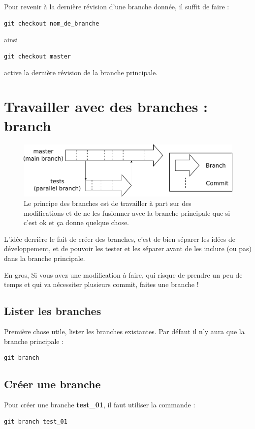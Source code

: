 \documentclass[a4paper,twoside]{article}
\begin{document}
Pour revenir à la dernière révision d'une branche donnée, il suffit de faire :
\begin{verbatim}
git checkout nom_de_branche
\end{verbatim}
ainsi
\begin{verbatim}
git checkout master
\end{verbatim}
active la dernière révision de la branche principale.


\section{Travailler avec des branches : branch}
\begin{figure}[htb]
\centering
\includegraphics[width=0.75\linewidth]{figure/branchs.pdf}
\caption{Le principe des branches est de travailler à part sur des modifications et de ne les fusionner avec la branche principale que si c'est ok et ça donne quelque chose.}
\end{figure}

L'idée derrière le fait de créer des branches, c'est de bien séparer les idées de développement, et de pouvoir les tester et les séparer avant de les inclure (ou pas) dans la branche principale. 

\begin{important}
En gros, Si vous avez une modification à faire, qui risque de prendre un peu de temps et qui va nécessiter plusieurs commit, faites une branche !
\end{important}


\subsection{Lister les branches}
Première chose utile, lister les branches existantes. Par défaut il n'y aura que la branche principale : 
\begin{verbatim}
git branch
\end{verbatim}

\subsection{Créer une branche}
Pour créer une branche \textbf{test\_01}, il faut utiliser la commande :
\begin{verbatim}
git branch test_01
\end{verbatim}
\end{document}
